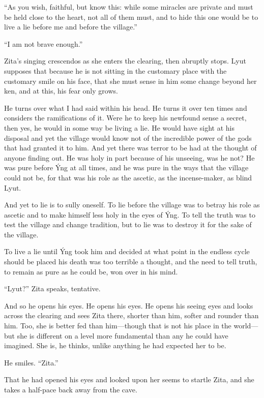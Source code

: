 ``As you wish, faithful, but know this: while some miracles are private and must be held close to the heart, not all of them must, and to hide this one would be to live a lie before me and before the village.''

``I am not brave enough.''

Zita's singing crescendos as she enters the clearing, then abruptly stops. Lyut supposes that because he is not sitting in the customary place with the customary smile on his face, that she must sense in him some change beyond her ken, and at this, his fear only grows.

He turns over what I had said within his head. He turns it over ten times and considers the ramifications of it. Were he to keep his newfound sense a secret, then yes, he would in some way be living a lie. He would have sight at his disposal and yet the village would know not of the incredible power of the gods that had granted it to him. And yet there was terror to be had at the thought of anyone finding out. He was holy in part because of his unseeing, was he not? He was pure before Ýng at all times, and he was pure in the ways that the village could not be, for that was his role as the ascetic, as the incense-maker, as blind Lyut.

And yet to lie is to sully oneself. To lie before the village was to betray his role as ascetic and to make himself less holy in the eyes of Ýng. To tell the truth was to test the village and change tradition, but to lie was to destroy it for the sake of the village.

To live a lie until Ýng took him and decided at what point in the endless cycle should be placed his death was too terrible a thought, and the need to tell truth, to remain as pure as he could be, won over in his mind.

``Lyut?'' Zita speaks, tentative.

And so he opens his eyes. He opens his eyes. He opens his seeing eyes and looks across the clearing and sees Zita there, shorter than him, softer and rounder than him. Too, she is better fed than him---though that is not his place in the world---but she is different on a level more fundamental than any he could have imagined. She is, he thinks, unlike anything he had expected her to be.

He smiles. ``Zita.''

That he had opened his eyes and looked upon her seems to startle Zita, and she takes a half-pace back away from the cave.

